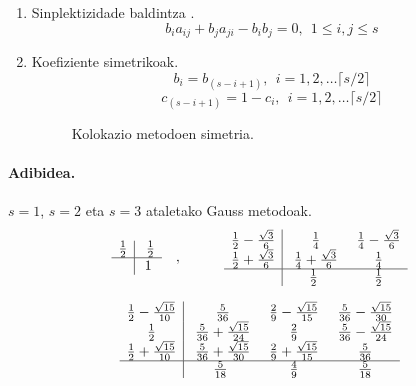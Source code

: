 \begin{enumerate}
\item{Sinplektizidade baldintza} \cite{JMSanz-Serna1994}.
\begin{equation} \label{eq:1}
b_{i}a_{ij}+b_{j}a_{ji}-b_{i}b_{j}=0, \ \ 1 \leqslant i,j \leqslant s
\end{equation}
 
\item{Koefiziente simetrikoak}.
 \begin{equation} \label {eq:2}
 b_{i} = b_{(s-i+1)} ,\ \  i=1,2,\dots \lceil s/2\rceil
 \end{equation} 
  \begin{equation} \label{eq:3}
 c_{(s-i+1)}= 1-c_{i}, \ \  i=1,2,\dots \lceil s/2\rceil
 \end{equation} 
 
 \begin{figure}[h]
 \centering
 \caption{ \small Kolokazio metodoen simetria.}
 \label{fig:pendulua}
 \end{figure}
  
\end{enumerate}

\paragraph{\textbf{Adibidea}.} $s=1$, $s=2$ eta $s=3$ ataletako Gauss metodoak.
\begin{equation*}
\begin{array}{c|c}
  \frac{1}{2} & \ \frac{1}{2} \\
  \hline
   & 1 \\
\end{array} \ \ \ ,  \ \ \ \ \ \ \ \ \
\begin{array}{c|c c}
  \frac{1}{2}-\frac{\sqrt{3}}{6} & \ \frac{1}{4} & \ \frac{1}{4}-\frac{\sqrt{3}}{6} \\
  \frac{1}{2}+\frac{\sqrt{3}}{6} & \ \frac{1}{4}+\frac{\sqrt{3}}{6} & \ \frac{1}{4} \\
  \hline
         &  \frac{1}{2} & \ \frac{1}{2} \\
\end{array}
\end{equation*}

\begin{equation*}
\begin{array}{c|c c c}
  \frac{1}{2}-\frac{\sqrt{15}}{10} & \ \frac{5}{36} & \ \frac{2}{9}-\frac{\sqrt{15}}{15} & \ \frac{5}{36}-\frac{\sqrt{15}}{30} \\
  \frac{1}{2}   & \ \frac{5}{36}+\frac{\sqrt{15}}{24} & \ \frac{2}{9} & \ \frac{5}{36}-\frac{\sqrt{15}}{24} \\
  \frac{1}{2}+\frac{\sqrt{15}}{10}   & \ \frac{5}{36}+\frac{\sqrt{15}}{30} & \ \frac{2}{9}+\frac{\sqrt{15}}{15} & \ \frac{5}{36} \\
  \hline
  & \frac{5}{18} & \ \frac{4}{9} & \ \frac{5}{18}
\end{array}
\end{equation*}

